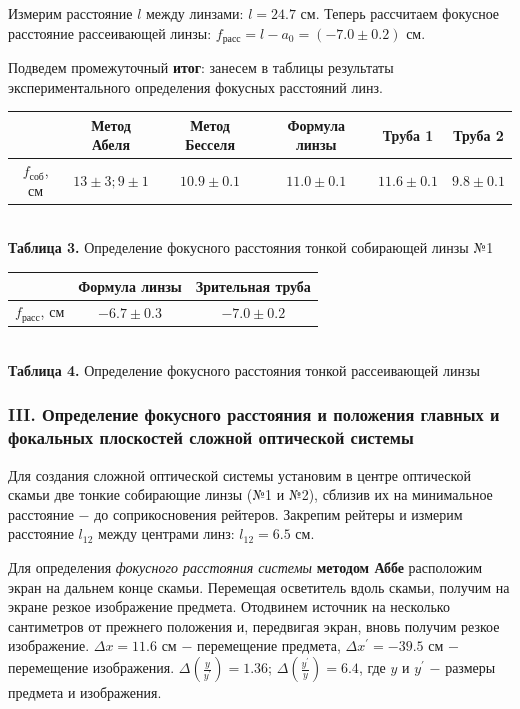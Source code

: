 \documentclass[a4paper,12pt]{article} %
\begin{document}
\hfill \break Измерим расстояние $l$ между линзами: $l = 24.7$ см. Теперь рассчитаем фокусное расстояние рассеивающей линзы: $f_{\text{расс}} = l - a_{0} = (-7.0 \pm 0.2)$ см. 

\hfill \break Подведем промежуточный \textbf{итог}: занесем в таблицы результаты экспериментального определения фокусных расстояний линз.

\begin{center}
\begin{tabular}{|c|c|c|c|c|c|}\hline
$ \text{ } $ & Метод Абеля & Метод Бесселя & Формула линзы & Труба 1 & Труба 2\\\hline
$ f_{\text{соб}} $, см & $ 13 \pm 3; 9 \pm 1 $ & $ 10.9 \pm 0.1 $ & $ 11.0 \pm 0.1 $ & $ 11.6 \pm 0.1 $ & $ 9.8 \pm 0.1 $\\\hline
\end{tabular} \\
\hfill \break \textbf {Таблица 3.} Определение фокусного расстояния тонкой собирающей линзы №1\\
\end{center}

\begin{center}
\begin{tabular}{|c|c|c|}\hline
$ \text{ } $ & Формула линзы & Зрительная труба\\\hline
$ f_{\text{расс}} $, см & $ -6.7 \pm 0.3 $ & $ -7.0 \pm 0.2 $\\\hline
\end{tabular} \\
\hfill \break \textbf {Таблица 4.} Определение фокусного расстояния тонкой рассеивающей линзы\\
\end{center}

\subsubsection*{III. Определение фокусного расстояния и положения главных и фокальных плоскостей сложной оптической системы}
\hfill \break Для создания сложной оптической системы установим в центре оптической скамьи две тонкие собирающие линзы (№1 и №2), сблизив их на минимальное расстояние $-$ до соприкосновения рейтеров. Закрепим рейтеры и измерим расстояние $l_{12}$ между центрами линз: $l_{12} = 6.5$ см. 

\hfill \break Для определения \textit{фокусного расстояния системы} \textbf{методом Аббе} расположим экран на дальнем конце скамьи. Перемещая осветитель вдоль скамьи, получим на экране резкое изображение предмета. Отодвинем источник на несколько сантиметров от прежнего положения и, передвигая экран, вновь получим резкое изображение. $\Delta x = 11.6$ см $-$ перемещение предмета, $\Delta x^\prime = -39.5$ см $-$ перемещение изображения. $\Delta \left( \frac {y} {y^\prime} \right) = 1.36$; $\Delta \left( \frac {y^\prime} {y} \right) = 6.4$, где $y$ и $y^\prime$ $-$ размеры предмета и изображения. 
\end{document}
